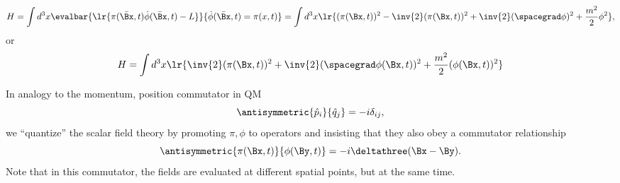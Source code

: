 \begin{dmath}\label{eqn:qftLecture4:940}
H
= \int d^3 x \evalbar{\lr{ \pi(\bar{\Bx}, t) \dot{\phi}(\bar{\Bx}, t) - L }}{\dot{\phi}(\bar{\Bx}, t) = \pi(x, t) }
= \int d^3 x \lr{ (\pi(\Bx, t))^2 - \inv{2} (\pi(\Bx, t))^2 + \inv{2} (\spacegrad \phi)^2 + \frac{m^2}{2} \phi^2 },
\end{dmath}
or
\begin{dmath}\label{eqn:qftLecture4:960}
H
= \int d^3 x \lr{ \inv{2} (\pi(\Bx, t))^2 + \inv{2} (\spacegrad \phi(\Bx, t))^2 + \frac{m^2}{2} (\phi(\Bx, t))^2 }
\end{dmath}

In analogy to the momentum, position commutator in QM
\begin{dmath}\label{eqn:qftLecture4:1000}
\antisymmetric{\hat{p}_i}{\hat{q}_j} = -i \delta_{ij},
\end{dmath}
we ``quantize'' the scalar field theory by promoting \( \pi, \phi \) to operators and insisting that they also obey a commutator relationship
\begin{dmath}\label{eqn:qftLecture4:980}
\antisymmetric{\pi(\Bx, t)}{\phi(\By, t)} = -i \deltathree(\Bx - \By).
\end{dmath}
Note that in this commutator, the fields are evaluated at different spatial points, but at the same time.
